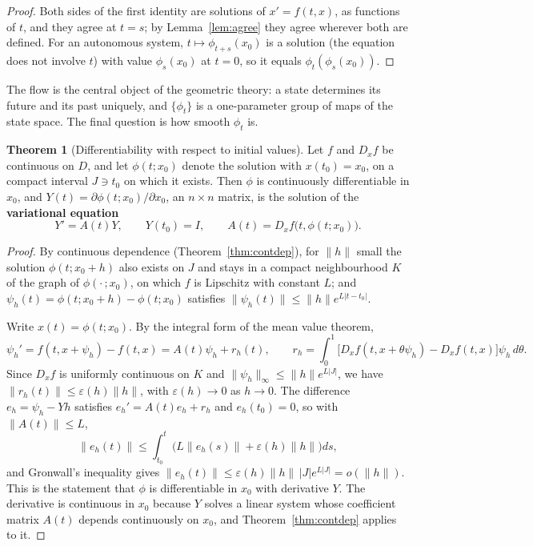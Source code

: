 \documentclass[11pt,a4paper]{article}
\numberwithin{equation}{section}
\theoremstyle{definition}
\newtheorem{thm}{Theorem}[subsection]
\begin{document}
\begin{proof}
Both sides of the first identity are solutions of $x' = f(t, x)$, as functions of $t$, and they agree at $t = s$; by Lemma~\ref{lem:agree} they agree wherever both are defined. For an
autonomous system, $t \mapsto \phi_{t+s}(x_0)$ is a solution (the equation does not involve $t$) with value $\phi_s(x_0)$ at $t = 0$, so it equals $\phi_t(\phi_s(x_0))$.
\end{proof}

The flow is the central object of the geometric theory: a state determines its future and its past uniquely, and $\{\phi_t\}$ is a one-parameter group of maps
of the state space. The final question is how smooth $\phi_t$ is.

\begin{thm}[Differentiability with respect to initial values]
\label{thm:variational}
Let $f$ and $D_xf$ be continuous on $D$, and let $\phi(t; x_0)$ denote the solution with $x(t_0) = x_0$, on a compact interval $J \ni t_0$ on which it exists. Then $\phi$ is continuously
differentiable in $x_0$, and $Y(t) = \partial\phi(t; x_0)/\partial x_0$, an $n \times n$ matrix, is the solution of the \textbf{variational equation}
\[
Y' = A(t)Y, \qquad Y(t_0) = I, \qquad A(t) = D_xf\bigl(t, \phi(t; x_0)\bigr) .
\]
\end{thm}

\begin{proof}
By continuous dependence (Theorem~\ref{thm:contdep}), for $\|h\|$ small the solution $\phi(t; x_0 + h)$ also exists on $J$ and stays in a compact neighbourhood $K$ of the graph of
$\phi(\cdot\,; x_0)$, on which $f$ is Lipschitz with constant $L$; and $\psi_h(t) = \phi(t; x_0 + h) - \phi(t; x_0)$ satisfies $\|\psi_h(t)\| \leq \|h\|e^{L|t - t_0|}$.

Write $x(t) = \phi(t; x_0)$. By the integral form of the mean value theorem,
\[
\psi_h' = f(t, x + \psi_h) - f(t, x) = A(t)\psi_h + r_h(t), \qquad r_h = \int_0^1\bigl[D_xf(t, x + \theta\psi_h) - D_xf(t, x)\bigr]\psi_h\,d\theta .
\]
Since $D_xf$ is uniformly continuous on $K$ and $\|\psi_h\|_\infty \leq \|h\|e^{L|J|}$, we have $\|r_h(t)\| \leq \varepsilon(h)\|h\|$, with $\varepsilon(h) \to 0$ as $h \to 0$. The difference $e_h = \psi_h - Yh$ satisfies
$e_h' = A(t)e_h + r_h$ and $e_h(t_0) = 0$, so with $\|A(t)\| \leq L$,
\[
\|e_h(t)\| \leq \int_{t_0}^t\bigl(L\|e_h(s)\| + \varepsilon(h)\|h\|\bigr)ds ,
\]
and Gronwall's inequality gives $\|e_h(t)\| \leq \varepsilon(h)\|h\|\,|J|e^{L|J|} = o(\|h\|)$. This is the statement that $\phi$ is differentiable in $x_0$ with derivative $Y$. The derivative is continuous in $x_0$
because $Y$ solves a linear system whose coefficient matrix $A(t)$ depends continuously on $x_0$, and Theorem~\ref{thm:contdep} applies to it.
\end{proof}
\end{document}
